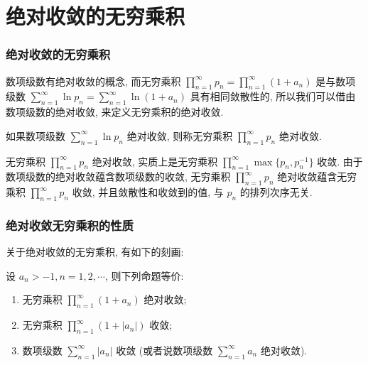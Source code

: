 
\section{绝对收敛的无穷乘积}


\begin{frame}
\frametitle{绝对收敛的无穷乘积}

数项级数有绝对收敛的概念, 而无穷乘积 $\prod_{n=1}^\infty p_n = \prod_{n=1}^\infty (1 + a_n)$ 是与数项级数 $\sum_{n=1}^\infty \ln p_n = \sum_{n=1}^\infty \ln (1 + a_n)$ 具有相同敛散性的, 所以我们可以借由数项级数的绝对收敛, 来定义无穷乘积的绝对收敛.

\pause

\begin{Def}[绝对收敛的无穷乘积]
如果数项级数 $\sum_{n=1}^\infty \ln p_n$ 绝对收敛, 则称无穷乘积 $\prod_{n=1}^\infty p_n$ 绝对收敛.
\end{Def}

\pause

\begin{remark}
无穷乘积 $\prod_{n=1}^\infty p_n$ 绝对收敛, 实质上是无穷乘积 $\prod_{n=1}^\infty \max \{p_n, p_n^{-1}\}$ 收敛. 由于数项级数的绝对收敛蕴含数项级数的收敛, 无穷乘积 $\prod_{n=1}^\infty p_n$ 绝对收敛蕴含无穷乘积 $\prod_{n=1}^\infty p_n$ 收敛, 并且敛散性和收敛到的值, 与 $p_n$ 的排列次序无关.
\end{remark}

\end{frame}


\begin{frame}
\frametitle{绝对收敛无穷乘积的性质}

关于绝对收敛的无穷乘积, 有如下的刻画:
\begin{thm}
设 $a_n > -1, n = 1, 2, \cdots$, 则下列命题等价:
\begin{enumerate}
\item 无穷乘积 $\prod_{n=1}^\infty (1 + a_n)$ 绝对收敛;
\item 无穷乘积 $\prod_{n=1}^\infty (1 + |a_n|)$ 收敛;
\item 数项级数 $\sum_{n=1}^\infty |a_n|$ 收敛 (或者说数项级数 $\sum_{n=1}^\infty a_n$ 绝对收敛).
\end{enumerate}
\end{thm}

\end{frame}

